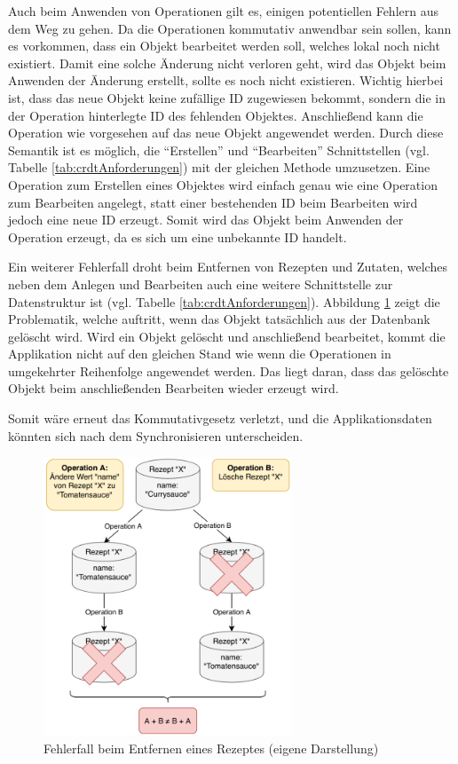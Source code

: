 \documentclass[a4paper, 12pt]{scrreprt}
\begin{document}
Auch beim Anwenden von Operationen gilt es, einigen potentiellen Fehlern aus dem Weg zu gehen. Da die Operationen kommutativ anwendbar sein sollen, kann es vorkommen, dass ein Objekt bearbeitet werden soll, welches lokal noch nicht existiert. Damit eine solche Änderung nicht verloren geht, wird das Objekt beim Anwenden der Änderung erstellt, sollte es noch nicht existieren. Wichtig hierbei ist, dass das neue Objekt keine zufällige ID zugewiesen bekommt, sondern die in der Operation hinterlegte ID des fehlenden Objektes. Anschließend kann die Operation wie vorgesehen auf das neue Objekt angewendet werden. Durch diese Semantik ist es möglich, die \enquote{Erstellen} und \enquote{Bearbeiten} Schnittstellen (vgl. Tabelle \ref{tab:crdtAnforderungen}) mit der gleichen Methode umzusetzen. Eine Operation zum Erstellen eines Objektes wird einfach genau wie eine Operation zum Bearbeiten angelegt, statt einer bestehenden ID beim Bearbeiten wird jedoch eine neue ID erzeugt. Somit wird das Objekt beim Anwenden der Operation erzeugt, da es sich um eine unbekannte ID handelt. 

Ein weiterer Fehlerfall droht beim Entfernen von Rezepten und Zutaten, welches neben dem Anlegen und Bearbeiten auch eine weitere Schnittstelle zur Datenstruktur ist (vgl. Tabelle \ref{tab:crdtAnforderungen}). Abbildung \ref{fig:rezeptLöschenSchlecht} zeigt die Problematik, welche auftritt, wenn das Objekt tatsächlich aus der Datenbank gelöscht wird. Wird ein Objekt gelöscht und anschließend bearbeitet, kommt die Applikation nicht auf den gleichen Stand wie wenn die Operationen in umgekehrter Reihenfolge angewendet werden. Das liegt daran, dass das gelöschte Objekt beim anschließenden Bearbeiten wieder erzeugt wird. 

Somit wäre erneut das Kommutativgesetz verletzt, und die Applikationsdaten könnten sich nach dem Synchronisieren unterscheiden. 

\begin{figure}[H]
	\centering
	\includegraphics[width=0.66\textwidth]{deleteRecipeBad.png}
	\caption[Fehlerfall beim Entfernen eines Rezeptes]{Fehlerfall beim Entfernen eines Rezeptes (eigene Darstellung)}
	\label{fig:rezeptLöschenSchlecht}
\end{figure}
\end{document}
